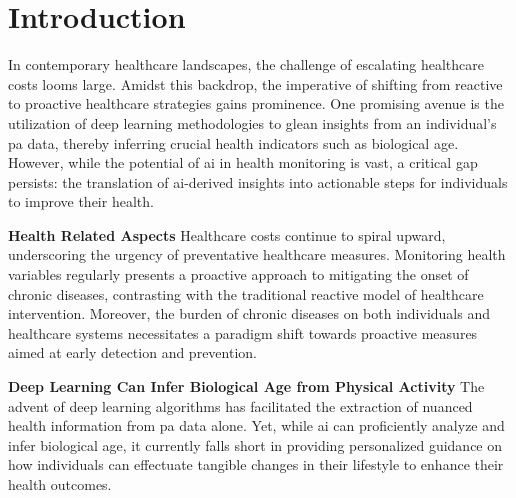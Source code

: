 \section{Introduction}
\label{sec:introduction}





In contemporary healthcare landscapes, the challenge of escalating healthcare costs looms large. Amidst this backdrop, the imperative of shifting from reactive to proactive healthcare strategies gains prominence. One promising avenue is the utilization of deep learning methodologies to glean insights from an individual's \acrfull{pa} data, thereby inferring crucial health indicators such as biological age. However, while the potential of \acrfull{ai} in health monitoring is vast, a critical gap persists: the translation of \acrshort{ai}-derived insights into actionable steps for individuals to improve their health.

\textbf{Health Related Aspects} Healthcare costs continue to spiral upward, underscoring the urgency of preventative healthcare measures. Monitoring health variables regularly presents a proactive approach to mitigating the onset of chronic diseases, contrasting with the traditional reactive model of healthcare intervention. Moreover, the burden of chronic diseases on both individuals and healthcare systems necessitates a paradigm shift towards proactive measures aimed at early detection and prevention.

\textbf{Deep Learning Can Infer Biological Age from Physical Activity} The advent of deep learning algorithms has facilitated the extraction of nuanced health information from \acrshort{pa} data alone. Yet, while \acrshort{ai} can proficiently analyze and infer biological age, it currently falls short in providing personalized guidance on how individuals can effectuate tangible changes in their lifestyle to enhance their health outcomes.

